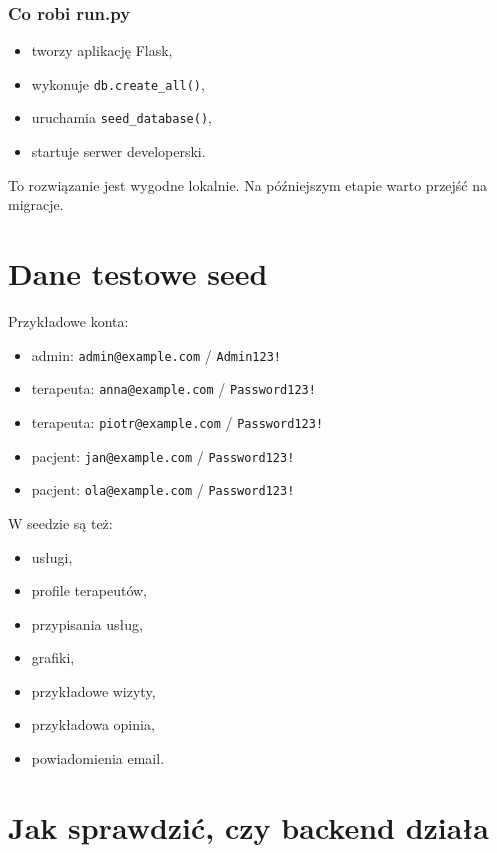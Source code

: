 \documentclass[11pt,a4paper]{article}
\begin{document}
\subsubsection*{Co robi run.py}
\begin{itemize}[leftmargin=1.2cm]
    \item tworzy aplikację Flask,
    \item wykonuje \texttt{db.create\_all()},
    \item uruchamia \texttt{seed\_database()},
    \item startuje serwer developerski.
\end{itemize}

To rozwiązanie jest wygodne lokalnie. Na późniejszym etapie warto przejść na migracje.

\section{Dane testowe seed}

Przykładowe konta:
\begin{itemize}[leftmargin=1.2cm]
    \item admin: \texttt{admin@example.com} / \texttt{Admin123!}
    \item terapeuta: \texttt{anna@example.com} / \texttt{Password123!}
    \item terapeuta: \texttt{piotr@example.com} / \texttt{Password123!}
    \item pacjent: \texttt{jan@example.com} / \texttt{Password123!}
    \item pacjent: \texttt{ola@example.com} / \texttt{Password123!}
\end{itemize}

W seedzie są też:
\begin{itemize}[leftmargin=1.2cm]
    \item usługi,
    \item profile terapeutów,
    \item przypisania usług,
    \item grafiki,
    \item przykładowe wizyty,
    \item przykładowa opinia,
    \item powiadomienia email.
\end{itemize}

\section{Jak sprawdzić, czy backend działa}
\end{document}

